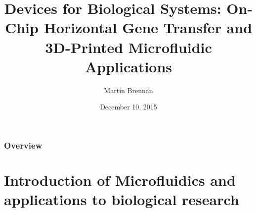 \documentclass{beamer}
\title[Devices for Biological Systems]{Devices for Biological Systems: On-Chip Horizontal Gene Transfer and 3D-Printed Microfluidic Applications} %
\author{Martin Brennan} %
\institute[UIC] %
{
University of Illinois at Chicago \\ %
\medskip
\textit{mbrenn3@uic.edu} %
}
\date{December 10, 2015} %
\begin{document}
\begin{frame}
\titlepage %
\end{frame}

\begin{frame}
\frametitle{Overview} %
\tableofcontents %
\end{frame}


\section{Introduction of Microfluidics and applications to biological research} %
\end{document}
